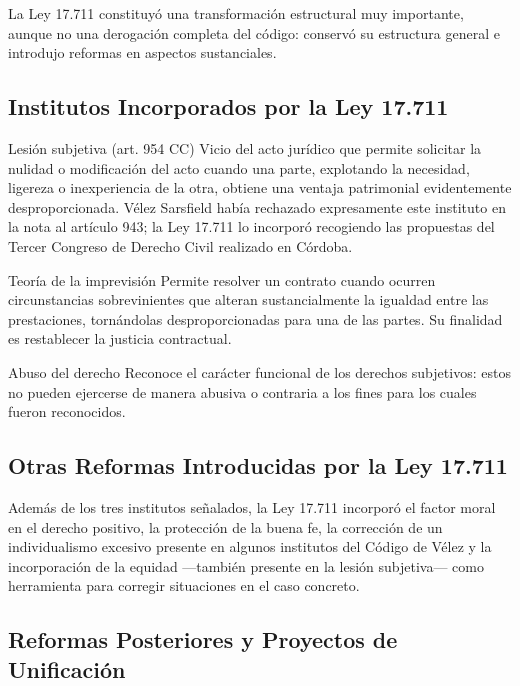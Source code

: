 \documentclass[12pt,oneside]{book}
\begin{document}
La Ley 17.711 constituyó una transformación estructural muy importante, aunque no una derogación completa del código: conservó su estructura general e introdujo reformas en aspectos sustanciales.

\subsection{Institutos Incorporados por la Ley 17.711}

\begin{definition}{Lesión subjetiva (art. 954 CC)}
Vicio del acto jurídico que permite solicitar la nulidad o modificación del acto cuando una parte, explotando la necesidad, ligereza o inexperiencia de la otra, obtiene una ventaja patrimonial evidentemente desproporcionada. Vélez Sarsfield había rechazado expresamente este instituto en la nota al artículo 943; la Ley 17.711 lo incorporó recogiendo las propuestas del Tercer Congreso de Derecho Civil realizado en Córdoba.
\end{definition}

\begin{definition}{Teoría de la imprevisión}
Permite resolver un contrato cuando ocurren circunstancias sobrevinientes que alteran sustancialmente la igualdad entre las prestaciones, tornándolas desproporcionadas para una de las partes. Su finalidad es restablecer la justicia contractual.
\end{definition}

\begin{definition}{Abuso del derecho}
Reconoce el carácter funcional de los derechos subjetivos: estos no pueden ejercerse de manera abusiva o contraria a los fines para los cuales fueron reconocidos.
\end{definition}

\subsection{Otras Reformas Introducidas por la Ley 17.711}

Además de los tres institutos señalados, la Ley 17.711 incorporó el factor moral en el derecho positivo, la protección de la buena fe, la corrección de un individualismo excesivo presente en algunos institutos del Código de Vélez y la incorporación de la equidad —también presente en la lesión subjetiva— como herramienta para corregir situaciones en el caso concreto.

\subsection{Reformas Posteriores y Proyectos de Unificación}
\end{document}
